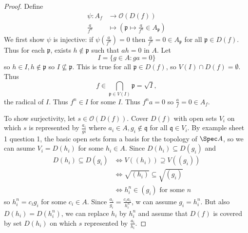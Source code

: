 \documentclass[a4paper]{article}
\newcommand{\sh}[1]{\mathcal{#1}} %
\begin{document}
\begin{proof}
  Define
  \begin{align*}
    \psi: A_f &\to \sh O(D(f)) \\
    \frac{a}{f^n} &\mapsto (\mathfrak p \mapsto \frac{a}{f^n} \in A_{\mathfrak p})
  \end{align*}
  We first show \(\psi\) is injective: if \(\psi(\frac{a}{f^n}) = 0\) then \(\frac{a}{f^n} = 0 \in A_{\mathfrak p}\) for all \(\mathfrak p \in D(f)\). Thus for each \(\mathfrak p\), exists \(h \notin \mathfrak p\) such that \(ah = 0\) in \(A\). Let
  \[
    I = \{g \in A: g a = 0\}
  \]
  so \(h \in I, h \notin \mathfrak p\) so \(I \nsubseteq \mathfrak p\). This is true for all \(\mathfrak p \in D(f)\), so \(V(I) \cap D(f) = \emptyset\). Thus
  \[
    f \in \bigcap_{\mathfrak p \in V(I)} \mathfrak p = \sqrt I,
  \]
  the radical of \(I\). Thus \(f^n \in I\) for some \(I\). Thus \(f^n a = 0\) so \(\frac{a}{f} = 0 \in A_f\).

  To show surjectivity, let \(s \in \sh O(D(f))\). Cover \(D(f)\) with open sets \(V_i\) on which \(s\) is represented by \(\frac{a_i}{gi}\) where \(a_i \in A, g_i \notin \mathfrak q\) for all \(\mathfrak q \in V_i\). By example sheet 1 question 1, the basic open sets form a basis for the topology of \(\Spec A\), so we can asume \(V_i = D(h_i)\) for some \(h_i \in A\). Since \(D(h_i) \subseteq D(g_i)\) and
  \begin{align*}
    D(h_i) \subseteq D(g_i)
    &\iff V((h_i)) \supseteq V((g_i)) \\
    &\iff \sqrt{(h_i)} \subseteq \sqrt{(g_i)} \\
    &\iff h_i^n \in (g_i) \text{ for some } n
  \end{align*}
  so \(h_i^n = c_i g_i\) for some \(c_i \in A\). Since \(\frac{a_i}{g_i} = \frac{c_i a_i}{h_i^n}\), w can assume \(g_i = h_i^n\). But also \(D(h_i) = D(h_i^n)\), we can replace \(h_i\) by \(h_i^n\) and assume that \(D(f)\) is covered by set \(D(h_i)\) on which \(s\) represented by \(\frac{a_i}{h_i}\).
\end{proof}




\printindex
\end{document}
